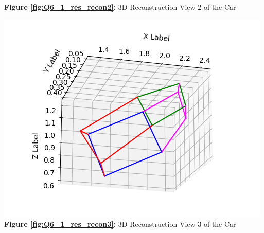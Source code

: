 \begin{your_solution}[title=Q6.1,height=21.5cm,width=\linewidth]
\begin{minipage}[b]{0.28\textwidth}
	\textbf{Figure \ref{fig:Q6_1_res_recon2}:} 3D Reconstruction View 2 of the Car
	\label{fig:Q6_1_res_recon2}  
\end{minipage}
\begin{minipage}[b]{0.34\textwidth}
	\centering
	\includegraphics[width=\textwidth]{../Q6_1_res_recon3.png}
	\textbf{Figure \ref{fig:Q6_1_res_recon3}:} 3D Reconstruction View 3 of the Car
	\label{fig:Q6_1_res_recon3}  
\end{minipage}
\end{your_solution}
\newpage
